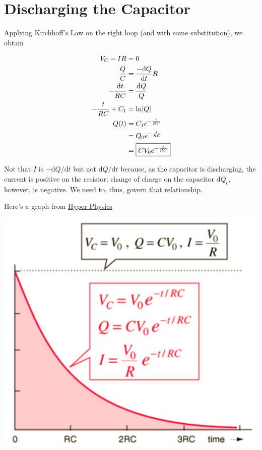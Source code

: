 \section{Discharging the Capacitor}

Applying Kirchhoff's Law on the right loop (and with some substitution), we obtain 

\begin{align*}
    V_C - IR &= 0\\
    \frac{Q}{C} &= \frac{-\mathrm{d}Q}{\mathrm{d}t} R\\
    -\frac{\mathrm{d}t}{RC} &= \frac{\mathrm{d}Q}{Q}\\
    -\frac{t}{RC} + C_1 &= \ln\abs{Q}\\
    Q(t) &= C_1 e^{-\frac{t}{RC}}\\
    &= Q_0 e^{-\frac{t}{RC}}\\
    &= \boxed{CV_0 e^{-\frac{t}{RC}}}
\end{align*}

Not that $I$ is $-\mathrm{d}Q / \mathrm{d}t$ but not $\mathrm{d}Q / \mathrm{d}t$ because, as the capacitor is discharging, the current is positive on the resistor; change of charge on the capacitor $\mathrm{d}Q_c$, however, is negative. We need to, thus, govern that relationship.

Here's a graph from \href{http://hyperphysics.phy-astr.gsu.edu/hbase/hph.html}{Hyper Physics}

\begin{center}
    \includegraphics[scale=0.6]{assets/hp-c-discharging.png}
\end{center}

